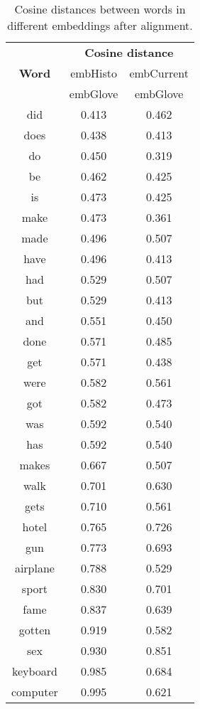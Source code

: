 \documentclass[runningheads]{llncs}
\begin{document}
\begin{table}
\begin{minipage}{.44\linewidth}
\centering
\caption{Cosine distances between words in different embeddings after alignment.}
\label{tab:cosdist}
\begin{tabular}{|c|c|c|}
\hline
\multirow{3}{*}{{\bfseries Word}} & \multicolumn{2}{|c|}{{\bfseries Cosine distance}}\\\cline{2-3}
&embHisto&embCurrent\\\cline{2-3}
&embGlove&embGlove\\
\hline
did & 0.413 & 0.462\\
does & 0.438 & 0.413\\
do & 0.450 & 0.319\\
be & 0.462 & 0.425\\
is & 0.473 & 0.425\\
make & 0.473 & 0.361\\
made & 0.496 & 0.507\\
have & 0.496 & 0.413\\
had & 0.529 & 0.507\\
but & 0.529 & 0.413\\
and & 0.551 & 0.450\\
done & 0.571 & 0.485\\
get & 0.571 & 0.438\\
were & 0.582 & 0.561\\
got & 0.582 & 0.473\\
was & 0.592 & 0.540\\
has & 0.592 & 0.540\\
makes & 0.667 & 0.507\\
walk & 0.701 & 0.630\\
gets & 0.710 & 0.561\\
hotel & 0.765 & 0.726\\
gun & 0.773 & 0.693\\
airplane & 0.788 & 0.529\\
sport & 0.830 & 0.701\\
fame & 0.837 & 0.639\\
gotten & 0.919 & 0.582\\
sex & 0.930 & 0.851\\
keyboard & 0.985 & 0.684\\
computer & 0.995 & 0.621\\
\hline
\end{tabular}
\end{minipage}
\begin{minipage}{.1\linewidth}

\end{minipage}
\end{table}
\end{document}
